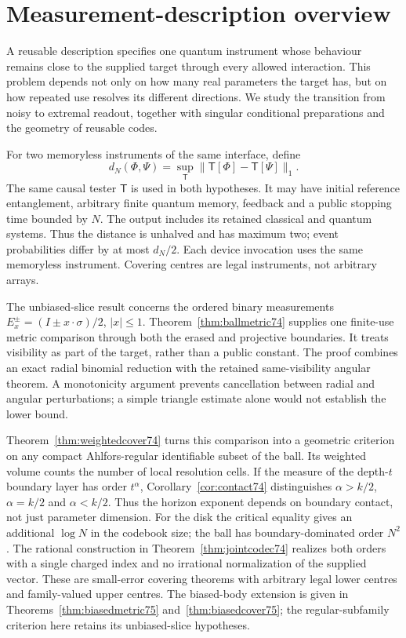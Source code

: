 \section{Measurement-description overview}
A reusable description specifies one quantum instrument whose behaviour
remains close to the supplied target through every allowed interaction.
This problem depends not only on how many real parameters the target
has, but on how repeated use resolves its different directions.
We study the transition from noisy to extremal readout, together with
singular conditional preparations and the geometry of reusable codes.

For two memoryless instruments of the same interface, define
\[
 d_N(\Phi,\Psi)=\sup_{\mathsf T}
       \|\mathsf T[\Phi]-\mathsf T[\Psi]\|_1.
\]
The same causal tester $\mathsf T$ is used in both hypotheses. It may
have initial reference entanglement, arbitrary finite quantum memory,
feedback and a public stopping time bounded by $N$. The output includes
its retained classical and quantum systems. Thus the distance is
unhalved and has maximum two; event probabilities differ by at most
$d_N/2$. Each device invocation uses the same memoryless instrument.
Covering centres are legal instruments, not arbitrary arrays.

The unbiased-slice result concerns the ordered binary measurements
$E_x^\pm=(I\pm x\cdot\sigma)/2$, $|x|\le1$.
Theorem~\ref{thm:ballmetric74} supplies one finite-use metric comparison
through both the erased and projective boundaries. It treats visibility
as part of the target, rather than a public constant. The proof combines
an exact radial binomial reduction with the retained same-visibility
angular theorem. A monotonicity argument prevents cancellation between
radial and angular perturbations; a simple triangle estimate alone
would not establish the lower bound.

Theorem~\ref{thm:weightedcover74} turns this comparison into a geometric
criterion on any compact Ahlfors-regular identifiable subset of the ball.
Its weighted volume counts the number of local resolution cells. If
the measure of the depth-$t$ boundary layer has order $t^\alpha$,
Corollary~\ref{cor:contact74} distinguishes $\alpha>k/2$, $\alpha=k/2$
and $\alpha<k/2$. Thus the horizon exponent depends on boundary contact,
not just parameter dimension. For the disk the critical equality gives
an additional $\log N$ in the codebook size; the ball has boundary-dominated
order $N^2$. The rational construction in
Theorem~\ref{thm:jointcodec74} realizes both orders with a single charged
index and no irrational normalization of the supplied vector.
These are small-error covering theorems with arbitrary legal lower
centres and family-valued upper centres. The biased-body extension is given in
Theorems~\ref{thm:biasedmetric75} and~\ref{thm:biasedcover75};
the regular-subfamily criterion here retains its unbiased-slice hypotheses.


